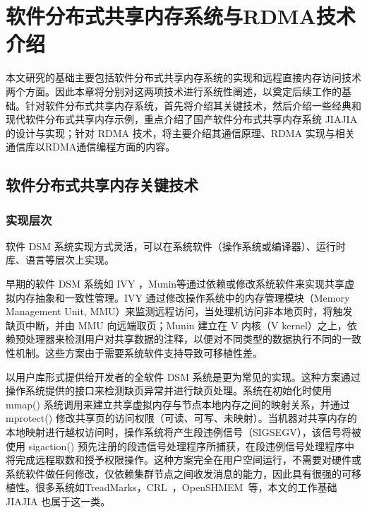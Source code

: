 \chapter{软件分布式共享内存系统与RDMA技术介绍}\label{chap:sdsm}{
本文研究的基础主要包括软件分布式共享内存系统的实现和远程直接内存访问技术两个方面。因此本章将分别对这两项技术进行系统性阐述，以奠定后续工作的基础。针对软件分布式共享内存系统，首先将介绍其关键技术，然后介绍一些经典和现代软件分布式共享内存示例，重点介绍了国产软件分布式共享内存系统 JIAJIA 的设计与实现；针对 RDMA 技术，将主要介绍其通信原理、RDMA 实现与相关通信库以RDMA通信编程方面的内容。
\section{软件分布式共享内存关键技术}

\subsection{实现层次}\label{sec:implementations}
软件 DSM 系统实现方式灵活，可以在系统软件（操作系统或编译器）、运行时库、语言等层次上实现。

早期的软件 DSM 系统如 IVY\citep{likai1988ivy} ，Munin\citep{bennett1990munin}等通过依赖或修改系统软件来实现共享虚拟内存抽象和一致性管理。IVY 通过修改操作系统中的内存管理模块（Memory Management Unit, MMU）来监测远程访问，当处理机访问非本地页时，将触发缺页中断，并由 MMU 向远端取页；Munin 建立在 V 内核（V kernel）之上，依赖预处理器来检测用户对共享数据的注释，以便对不同类型的数据执行不同的一致性机制。这些方案由于需要系统软件支持导致可移植性差。

以用户库形式提供给开发者的全软件 DSM 系统是更为常见的实现。这种方案通过操作系统提供的接口来检测缺页异常并进行缺页处理。系统在初始化时使用 mmap() 系统调用来建立共享虚拟内存与节点本地内存之间的映射关系，并通过 mprotect() 修改共享页的访问权限（可读、可写、未映射）。当机器对共享内存的本地映射进行越权访问时，操作系统将产生段违例信号（SIGSEGV），该信号将被使用 sigaction() 预先注册的段违信号处理程序所捕获，在段违例信号处理程序中将完成远程取数和授予权限操作。这种方案完全在用户空间运行，不需要对硬件或系统软件做任何修改，仅依赖集群节点之间收发消息的能力，因此具有很强的可移植性。很多系统如TreadMarks，CRL~\citep{}，OpenSHMEM~\citep{}等，本文的工作基础 JIAJIA 也属于这一类。

}
